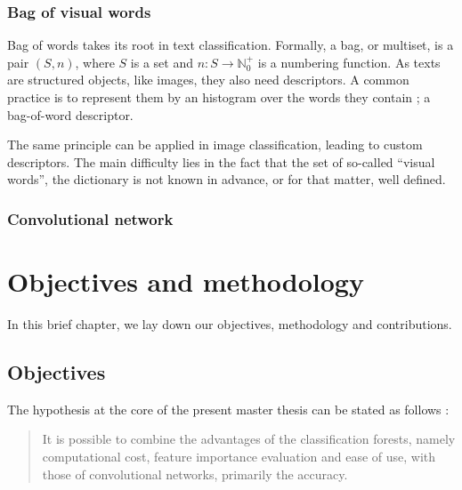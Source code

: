 \documentclass[a4paper]{report}
\begin{document}
\subsection{Bag of visual words}
Bag of words takes its root in text classification. Formally, a bag, or multiset, is a pair $(S, n)$, where $S$ is a set and $n : S \rightarrow \mathbb{N}_0^+$ is a numbering function. As texts are structured objects, like images, they also need descriptors. A common practice is to represent them by an histogram over the words they contain ; a bag-of-word descriptor.
\par
The same principle can be applied in image classification, leading to custom descriptors. The main difficulty lies in the fact that the set of so-called ``visual words'',  the dictionary is not known in advance, or for that matter, well defined. 

\subsection{Convolutional network}

\paragraph{}


\chapter{Objectives and methodology}
In this brief chapter, we lay down our objectives, methodology and contributions.

\section{Objectives}
The hypothesis at the core of the present master thesis can be stated as follows : 
\begin{quote}
It is possible to combine the advantages of the classification forests, namely computational cost, feature importance evaluation and ease of use, with those of convolutional networks, primarily the accuracy.
\end{quote}
\end{document}
